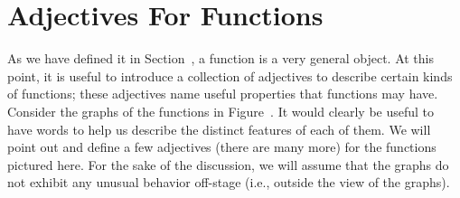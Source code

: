 \section{Adjectives For Functions}{}{}

As we have defined it in Section~, a function is
a very general object.  At this point, it is useful to introduce a
collection of adjectives to describe certain kinds of functions; these
adjectives name useful properties that functions may have.  Consider
the graphs of the functions in Figure~.  It
would clearly be useful to have words to help us describe the distinct
features of each of them.  We will point out and define a few
adjectives (there are many more) for the functions pictured here.  For
the sake of the discussion, we will assume that the graphs do not
exhibit any unusual behavior off-stage (i.e., outside the view of the
graphs).

